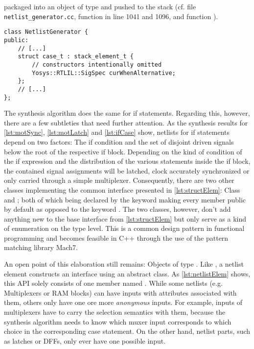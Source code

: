 packaged into an object of type  and pushed to the
stack (cf. file \texttt{netlist_generator.cc}, function
 in line 1041 and 1096, and function
).
%
\begin{lstlisting}[style=c++, caption={Case statement context class
      derived from stack_element_t}, label={lst:structElemCase}]
class NetlistGenerator {
public:
    // [...]
    struct case_t : stack_element_t {
        // constructors intentionally omitted
        Yosys::RTLIL::SigSpec curWhenAlternative;
    };
    // [...]
};
\end{lstlisting}
%
The synthesis algorithm does the same for if statements. Regarding
this, however, there are a few subtleties that need further attention.
As the synthesis results for \ref{lst:motSync}, \ref{lst:motLatch} and
\ref{lst:ifCase} show,
netlists
for if statements depend on two factors: The if condition and the set
of disjoint driven signals below the root of the respective if block.
Depending on the kind of condition of the if expression and the
distribution of the various statements inside the if block, the
contained signal assignments will be latched, clock accurately
synchronized or only carried through a simple
multiplexer. Consequently, there are two other classes implementing
the common interface presented in \ref{lst:structElem}: Class 
and ; both of which being declared by the 
keyword making every member public by default as opposed to the
keyword . The two classes, however, don't add anything new
to the base interface from \ref{lst:structElem} but only serve as a
kind of enumeration on the type level. This is a common design pattern
in functional programming and becomes feasible in C++ through the use
of the pattern matching library Mach7.

An open point of this elaboration still remains: Objects of type
.
Like , a netlist element constructs an interface
using an abstract class. As \ref{lst:netlistElem} shows, this API
solely consists of one member named . While some netlists
(e.g. Multiplexers or RAM blocks) can have inputs with attributes
associated with them, others only have one ore more \emph{anonymous}
inputs. For example, inputs of multiplexers have to carry the
selection semantics with them, because the synthesis algorithm needs
to know which muxer input corresponds to which choice in the
corresponding case statement. On the other hand, netlist parts, such
as latches or DFFs, only ever have one possible input.

